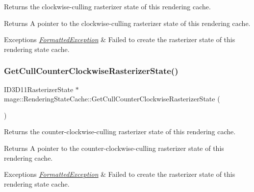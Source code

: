 Returns the clockwise-\/culling rasterizer state of this rendering cache.

\begin{DoxyReturn}{Returns}
A pointer to the clockwise-\/culling rasterizer state of this rendering cache. 
\end{DoxyReturn}

\begin{DoxyExceptions}{Exceptions}
{\em \hyperlink{structmage_1_1_formatted_exception}{Formatted\+Exception}} & Failed to create the rasterizer state of this rendering state cache. \\
\hline
\end{DoxyExceptions}
\hypertarget{structmage_1_1_rendering_state_cache_aa41c6a83a929c09f040dddbd4e21d5fb}{}\label{structmage_1_1_rendering_state_cache_aa41c6a83a929c09f040dddbd4e21d5fb} 
\subsubsection{\texorpdfstring{Get\+Cull\+Counter\+Clockwise\+Rasterizer\+State()}{GetCullCounterClockwiseRasterizerState()}}
{\footnotesize\ttfamily I\+D3\+D11\+Rasterizer\+State $\ast$ mage\+::\+Rendering\+State\+Cache\+::\+Get\+Cull\+Counter\+Clockwise\+Rasterizer\+State (\begin{DoxyParamCaption}{ }\end{DoxyParamCaption})}

Returns the counter-\/clockwise-\/culling rasterizer state of this rendering cache.

\begin{DoxyReturn}{Returns}
A pointer to the counter-\/clockwise-\/culling rasterizer state of this rendering cache. 
\end{DoxyReturn}

\begin{DoxyExceptions}{Exceptions}
{\em \hyperlink{structmage_1_1_formatted_exception}{Formatted\+Exception}} & Failed to create the rasterizer state of this rendering state cache. \\
\hline
\end{DoxyExceptions}
\hypertarget{structmage_1_1_rendering_state_cache_af9c689e85b54cf0af4018c20e3ab61a1}{}\label{structmage_1_1_rendering_state_cache_af9c689e85b54cf0af4018c20e3ab61a1} 
